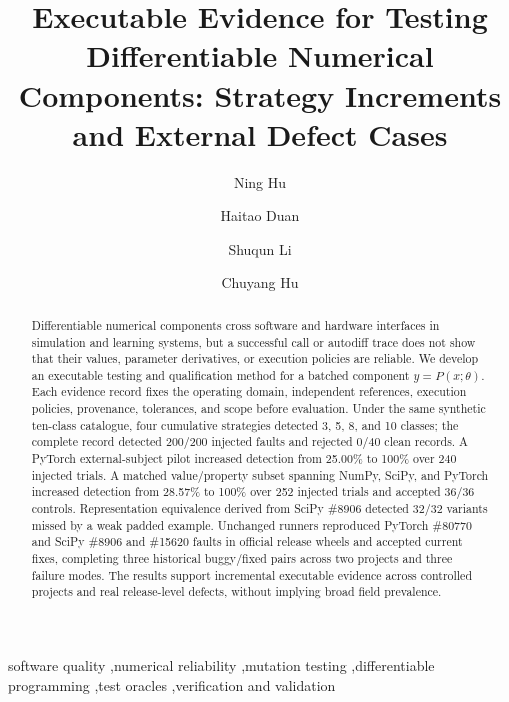 \documentclass[preprint,12pt,authoryear]{elsarticle}
\begin{document}
\begin{frontmatter}
\title{Executable Evidence for Testing Differentiable Numerical Components: Strategy Increments and External Defect Cases}
\author[mech]{Ning Hu}
\author[cs]{Haitao Duan}
\author[math]{Shuqun Li}
\author[ucsc]{Chuyang Hu}
\address[mech]{School of Mechanical Engineering, Hangzhou Dianzi University, No. 1158, 2nd Street, Qiantang District, Hangzhou 310018, Zhejiang, China}
\address[cs]{School of Computer Science, Hangzhou Dianzi University, No. 1158, 2nd Street, Qiantang District, Hangzhou 310018, Zhejiang, China}
\address[math]{School of Mathematics and Physics, Xi'an Jiaotong--Liverpool University, 111 Ren'ai Road, Suzhou Industrial Park, Suzhou 215123, Jiangsu, China}
\address[ucsc]{Department of Computer Science and Engineering, University of California, 1156 High Street, Santa Cruz, CA 95064, USA}

\begin{abstract}
Differentiable numerical components cross software and hardware interfaces in simulation and learning systems, but a successful call or autodiff trace does not show that their values, parameter derivatives, or execution policies are reliable. We develop an executable testing and qualification method for a batched component $y=P(x;\theta)$. Each evidence record fixes the operating domain, independent references, execution policies, provenance, tolerances, and scope before evaluation. Under the same synthetic ten-class catalogue, four cumulative strategies detected 3, 5, 8, and 10 classes; the complete record detected 200/200 injected faults and rejected 0/40 clean records. A PyTorch external-subject pilot increased detection from 25.00\% to 100\% over 240 injected trials. A matched value/property subset spanning NumPy, SciPy, and PyTorch increased detection from 28.57\% to 100\% over 252 injected trials and accepted 36/36 controls. Representation equivalence derived from SciPy \#8906 detected 32/32 variants missed by a weak padded example. Unchanged runners reproduced PyTorch \#80770 and SciPy \#8906 and \#15620 faults in official release wheels and accepted current fixes, completing three historical buggy/fixed pairs across two projects and three failure modes. The results support incremental executable evidence across controlled projects and real release-level defects, without implying broad field prevalence.
\end{abstract}

\begin{keyword}
software quality \sep numerical reliability \sep mutation testing \sep differentiable programming \sep test oracles \sep verification and validation
\end{keyword}
\end{frontmatter}
\end{document}
